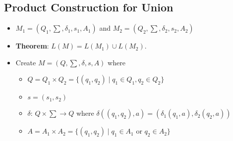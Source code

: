 \documentclass[12pt]{article}
\begin{document}
\subsection{Product Construction for Union}
\begin{itemize}
    \item $M_1 = (Q_1, \sum, \delta_1, s_1, A_1)$ and $M_2 = (Q_2, \sum, \delta_2, s_2, A_2)$
    \item \textbf{Theorem}: $L(M) = L(M_1) \cup L(M_2)$.
    \item Create $M = (Q, \sum, \delta, s, A)$ where
    \begin{itemize}
        \item $Q = Q_1 \times Q_2 = \{ (q_1, q_2) \mid q_1 \in Q_1, q_2 \in Q_2 \}$
        \item $s = (s_1, s_2)$
        \item $\delta$: $Q \times \sum \rightarrow Q$ where $\delta((q_1, q_2), a) = (\delta_1(q_1, a), \delta_2(q_2, a))$
        \item $A = A_1 \times A_2 = \{ (q_1, q_2) \mid q_1 \in A_1 $ or $ q_2 \in A_2 \}$
    \end{itemize}
\end{itemize}
\end{document}
